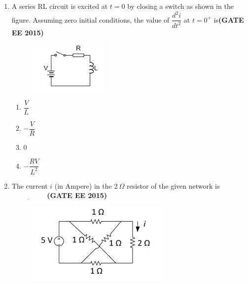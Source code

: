 \documentclass[a4paper,12pt]{exam}
\theoremstyle{remark}
\begin{document}
\begin{enumerate}
\begin{multicols}{4}
\begin{enumerate}
    \item $-j7.0$
    \item $-j8.5$
    \item $-j7.5$
    \item $-j9.0$
\end{enumerate}
\end{multicols}

\vspace{0.5cm}

\item A series RL circuit is excited at $t = 0$ by closing a switch as shown in the figure. Assuming zero initial conditions, the value of $\dfrac{d^2i}{dt^2}$ at $t=0^+$ is\hfill{\textbf{(GATE EE 2015)}}
\begin{figure}[H]
    \centering
    \includegraphics[width=0.5\columnwidth]{figs/2Q 28.png}
    \caption{}
    \label{fig:placeholder}
\end{figure}

\begin{multicols}{4}
\begin{enumerate}
    \item $\dfrac{V}{L}$
    \item $-\dfrac{V}{R}$
    \item $0$
    \item $-\dfrac{RV}{L^2}$
\end{enumerate}
\end{multicols}


\item The current $i$ (in Ampere) in the $2~\Omega$ resistor of the given network  is $\underline{\hspace{2cm}}$ \hfill{\textbf{(GATE EE 2015)}}
\begin{figure}[H]
    \centering
    \includegraphics[width=0.5\columnwidth]{figs/2Q 29.png}
    \caption{}
    \label{fig:placeholder}
\end{figure}


\end{enumerate}
\end{document}
